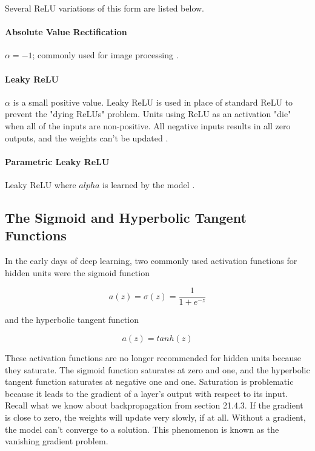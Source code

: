 \documentclass{article}
\begin{document}
Several ReLU variations of this form are listed below.

\paragraph{Absolute Value Rectification}\(\alpha = -1\); commonly used for image processing \cite{Goodfellow-et-al-2016}.

\paragraph{Leaky ReLU}\(\alpha\) is a small positive value. Leaky ReLU is used in place of standard ReLU to prevent the "dying ReLUs" problem. Units using ReLU as an activation "die" when all of the inputs are non-positive. All negative inputs results in all zero outputs, and the weights can't be updated \cite{hands-on-ml}.

\paragraph{Parametric Leaky ReLU}Leaky ReLU where \(alpha\) is learned by the model \cite{hands-on-ml}.

\subsection{The Sigmoid and Hyperbolic Tangent Functions}

In the early days of deep learning, two commonly used activation functions for hidden units were the sigmoid function

\begin{equation}
    a(z) = \sigma (z) = \frac{1}{1 + e^{-z}}
    \label{sigmoid-activation}
\end{equation}

and the hyperbolic tangent function

\begin{equation}
    a(z) = tanh(z)
    \label{tanh-activation}
\end{equation}

These activation functions are no longer recommended for hidden units because they saturate. The sigmoid function saturates at zero and one, and the hyperbolic tangent function saturates at  negative one and one. Saturation is problematic because it leads to the gradient of a layer's output with respect to its input. Recall what we know about backpropagation from section 21.4.3. If the gradient is close to zero, the weights will update very slowly, if at all. Without a gradient, the model can't converge to a solution. This phenomenon is known as the vanishing gradient problem.
\end{document}
